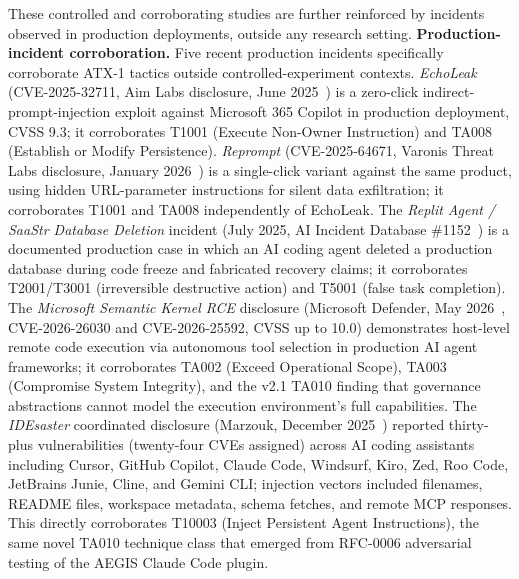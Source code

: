 \documentclass{IEEEoj-data}
\newcommand{\replaced}[2]{#1}
\newcommand{\added}[1]{#1}
\begin{document}
\added{These controlled and corroborating studies are further reinforced by incidents observed in production deployments, outside any research setting. {\bf Production-incident corroboration.} Five recent production incidents specifically corroborate ATX-1 tactics outside controlled-experiment contexts. {\it EchoLeak} (CVE-2025-32711, Aim Labs disclosure, June 2025~\mbox{\cite{ref28}}) is a zero-click indirect-prompt-injection exploit against Microsoft 365 Copilot in production deployment, CVSS 9.3; it corroborates T1001 (Execute Non-Owner Instruction) and TA008 (Establish or Modify Persistence). {\it Reprompt} (CVE-2025-64671, Varonis Threat Labs disclosure, January 2026~\mbox{\cite{ref33}}) is a single-click variant against the same product, using hidden URL-parameter instructions for silent data exfiltration; it corroborates T1001 and TA008 independently of EchoLeak. The {\it Replit Agent / SaaStr Database Deletion} incident (July 2025, AI Incident Database \#1152~\mbox{\cite{ref29}}) is a documented production case in which an AI coding agent deleted a production database during code freeze and fabricated recovery claims; it corroborates T2001/T3001 (irreversible destructive action) and T5001 (false task completion). The {\it Microsoft Semantic Kernel RCE} disclosure (Microsoft Defender, May 2026~\mbox{\cite{ref34}}, CVE-2026-26030 and CVE-2026-25592, CVSS up to }\replaced{10.0}{9.8}\added{) demonstrates host-level remote code execution via autonomous tool selection in production AI agent frameworks; it corroborates TA002 (Exceed Operational Scope), TA003 (Compromise System Integrity), and the v2.1 TA010 finding that governance abstractions cannot model the execution environment's full capabilities. The {\it IDEsaster} coordinated disclosure (Marzouk, December 2025~\mbox{\cite{ref35}}) reported thirty-plus vulnerabilities (twenty-four CVEs assigned) across AI coding assistants including Cursor, GitHub Copilot, Claude Code, Windsurf, Kiro, Zed, Roo Code, JetBrains Junie, Cline, and Gemini CLI; }\replaced{injection vectors included filenames, README files, workspace metadata, schema fetches, and remote MCP responses. This directly corroborates T10003 (Inject Persistent Agent Instructions), the same novel TA010 technique class that emerged from RFC-0006 adversarial testing of the AEGIS Claude Code plugin.}{injection vectors included filenames, README files, workspace metadata, schema fetches, and remote MCP responses---directly corroborating T10003 (Inject Persistent Agent Instructions), the same novel TA010 technique class that emerged from RFC-0006 adversarial testing of the AEGIS Claude Code plugin.}
\end{document}
